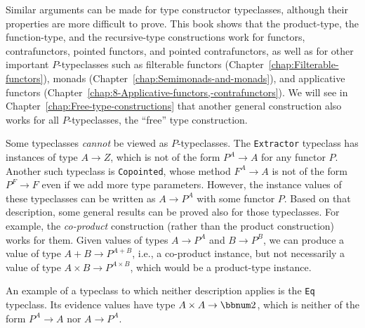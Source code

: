 Similar arguments can be made for type constructor typeclasses, although
their properties are more difficult to prove. This book shows that
the product-type, the function-type, and the recursive-type constructions
work for functors, contrafunctors, pointed functors, and pointed contrafunctors,
as well as for other important $P$-typeclasses such as filterable
functors (Chapter~\ref{chap:Filterable-functors}), monads (Chapter~\ref{chap:Semimonads-and-monads}),
and applicative functors (Chapter~\ref{chap:8-Applicative-functors,-contrafunctors}).
We will see in Chapter~\ref{chap:Free-type-constructions} that another
general construction also works for all $P$-typeclasses, \textemdash{}
the \textsf{``}free\textsf{''} type construction.

Some typeclasses \emph{cannot} be viewed as $P$-typeclasses. The
\lstinline!Extractor! typeclass has instances of type $A\rightarrow Z$,
which is not of the form $P^{A}\rightarrow A$ for any functor $P$.
Another such typeclass is \lstinline!Copointed!, whose method $F^{A}\rightarrow A$
is not of the form $P^{F}\rightarrow F$ even if we add more type
parameters. However, the instance values of these typeclasses can
be written as $A\rightarrow P^{A}$ with some functor $P$. Based
on that description, some general results can be proved also for those
typeclasses. For example, the \emph{co-product} construction (rather
than the product construction) works for them. Given values of types
$A\rightarrow P^{A}$ and $B\rightarrow P^{B}$, we can produce a
value of type $A+B\rightarrow P^{A+B}$, i.e., a co-product instance,
but not necessarily a value of type $A\times B\rightarrow P^{A\times B}$,
which would be a product-type instance. 

An example of a typeclass to which neither description applies is
the \lstinline!Eq! typeclass. Its evidence values have type $A\times A\rightarrow\bbnum 2$,
which is neither of the form $P^{A}\rightarrow A$ nor $A\rightarrow P^{A}$.

